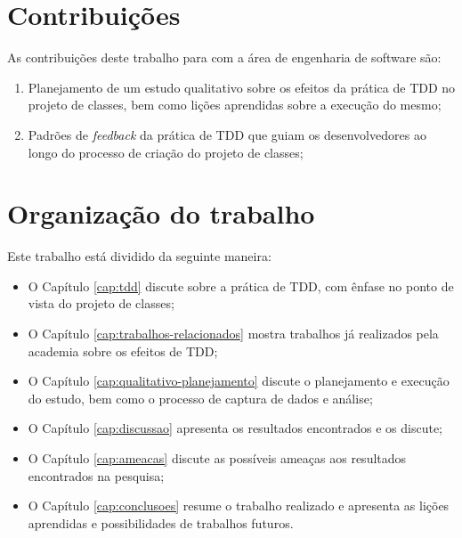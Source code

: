 \section{Contribuições}

As contribuições deste trabalho para com a área de engenharia de software
são:

\begin{enumerate}
	
	\item Planejamento de um estudo qualitativo sobre os efeitos da prática
	de TDD no projeto de classes, bem como lições aprendidas sobre a execução do mesmo;
	
	\item Padrões de \textit{feedback} da prática de TDD que guiam os desenvolvedores
	ao longo do processo de criação do projeto de classes;
	
\end{enumerate}

\section{Organização do trabalho}

Este trabalho está dividido da seguinte maneira: 

\begin{itemize}
	\item O Capítulo \ref{cap:tdd} discute sobre a prática de TDD, com ênfase no
	ponto de vista do projeto de classes;
  
	\item O Capítulo \ref{cap:trabalhos-relacionados} mostra trabalhos já
	realizados pela academia sobre os efeitos de TDD;

	\item O Capítulo \ref{cap:qualitativo-planejamento} discute o planejamento e execução do estudo,
	bem como o processo de captura de dados e análise;

	\item O Capítulo \ref{cap:discussao} apresenta os resultados encontrados e
	os discute;
	
	\item O Capítulo \ref{cap:ameacas} discute as possíveis ameaças aos resultados
	encontrados na pesquisa;
	
	\item O Capítulo \ref{cap:conclusoes} resume o trabalho realizado e apresenta
	as lições aprendidas e possibilidades de trabalhos futuros.
\end{itemize}


